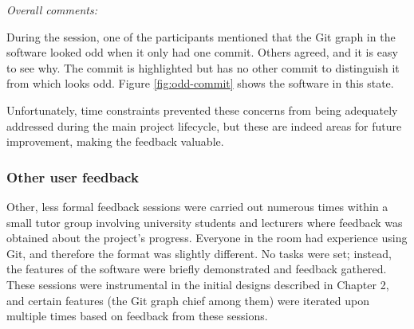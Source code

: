 \noindent \emph{Overall comments:}

During the session, one of the participants mentioned that the Git graph in the software looked odd when it only had one commit. Others agreed, and it is easy to see why. The commit is highlighted but has no other commit to distinguish it from which looks odd. Figure \ref{fig:odd-commit} shows the software in this state.


Unfortunately, time constraints prevented these concerns from being adequately addressed during the main project lifecycle, but these are indeed areas for future improvement, making the feedback valuable.

\subsubsection{Other user feedback}

Other, less formal feedback sessions were carried out numerous times within a small tutor group involving university students and lecturers where feedback was obtained about the project's progress. Everyone in the room had experience using Git, and therefore the format was slightly different. No tasks were set; instead, the features of the software were briefly demonstrated and feedback gathered. These sessions were instrumental in the initial designs described in Chapter 2, and certain features (the Git graph chief among them) were iterated upon multiple times based on feedback from these sessions.

